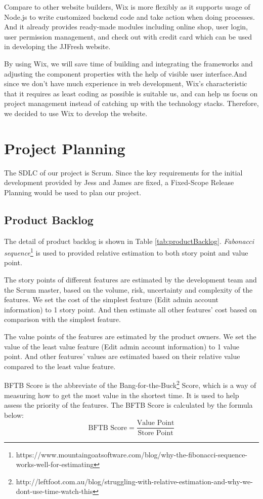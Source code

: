 \documentclass{report}
\begin{document}
Compare to other website builders, Wix is more flexibly as it supports usage of Node.js to write customized backend code and take action when doing processes. And it already provides ready-made modules including online shop, user login, user permission management, and check out with credit card which can be used in developing the JJFresh website.

By using Wix, we will save time of building and integrating the frameworks and adjusting the component properties with the help of visible user interface.And since we don't have much experience in web development, Wix's characteristic that it requires as least coding as possible is suitable us, and can help us focus on project management instead of catching up with the technology stacks. Therefore, we decided to use Wix to develop the website.

\section{Project Planning}
\label{sec:projectPlanning}
The SDLC of our project is Scrum. Since the key requirements for the initial development provided by Jess and James are fixed, a Fixed-Scope Release Planning would be used to plan our project.

\subsection{Product Backlog}
\label{sec:productBacklog}
The detail of product backlog is shown in Table \ref{tab:productBacklog}. \textit{Fabonacci sequence}\footnote{https://www.mountaingoatsoftware.com/blog/why-the-fibonacci-sequence-works-well-for-estimating} is used to provided relative estimation to both story point and value point.

The story points of different features are estimated by the development team and the Scrum master, based on the volume, risk, uncertainty and complexity of the features. We set the cost of the simplest feature (Edit admin account information) to 1 story point. And then estimate all other features' cost based on comparison with the simplest feature. 

The value points of the features are estimated by the product owners. We set the value of the least value feature (Edit admin account information) to 1 value point. And other features' values are estimated based on their relative value compared to the least value feature. 

BFTB Score is the abbreviate of the Bang-for-the-Buck\footnote{http://leftfoot.com.au/blog/struggling-with-relative-estimation-and-why-we-dont-use-time-watch-this} Score, which is a way of measuring how to get the most value in the shortest time. It is used to help assess the priority of the features. The BFTB Score is calculated by the formula below:
$$
  \text{BFTB Score} = \frac{\text{Value Point}}{\text{Store Point}}
$$
\end{document}
